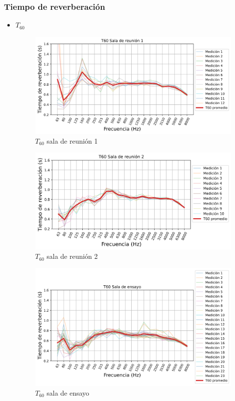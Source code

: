 \subsubsection{Tiempo de reverberación}
\begin{itemize}
    \item $T_{60}$
    \begin{figure}[H]
        \centering
        \includegraphics[width=12cm]{Imagenes/Resultados/T60_Sala_reunion_1.png}
        \caption{$T_{60}$ sala de reunión 1}
        \label{fig: T60 sala1}
    \end{figure}

    \begin{figure}[H]
        \centering
        \includegraphics[width=12cm]{Imagenes/Resultados/T60_Sala_reunion_2.png}
        \caption{$T_{60}$ sala de reunión 2}
        \label{fig: T60 sala2}
    \end{figure}

    \begin{figure}[H]
        \centering
        \includegraphics[width=12cm]{Imagenes/Resultados/T60_Sala_de_ensayo.png}
        \caption{$T_{60}$ sala de ensayo}
        \label{fig: T60 sala de ensayo}
    \end{figure}
    

\end{itemize}
